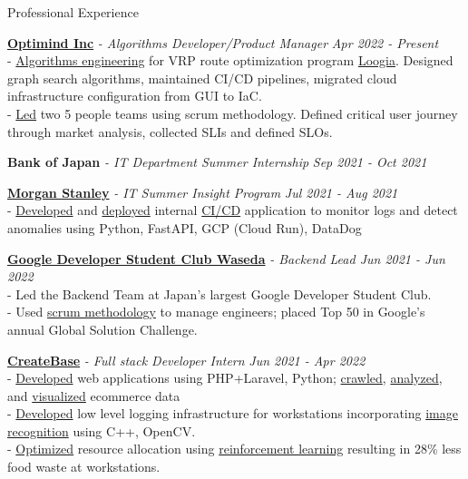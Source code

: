 \documentclass{resume} %
\begin{document}
\begin{rSection}{Professional Experience}

{\bf \href{https://www.optimind.tech/}{Optimind Inc}} {\textit{- Algorithms Developer/Product Manager }} \hfill {\em Apr 2022 - Present} 
\\- \uline{Algorithms engineering} for VRP route optimization program \href{https://loogia.jp/?_ga=2.72237267.1726635224.1669133714-1962149220.1665458028}{Loogia}. Designed graph search algorithms, maintained CI/CD pipelines, migrated cloud infrastructure configuration from GUI to IaC. 
\\- \uline{Led} two 5 people teams using scrum methodology. Defined critical user journey through market analysis, collected SLIs and defined SLOs.  


{\bf Bank of Japan}{\textit{ - IT Department Summer Internship}} \hfill {\em Sep 2021 - Oct 2021} 

{\bf \href{https://www.morganstanley.co.jp/ja}{Morgan Stanley}}\textit{ - IT Summer Insight Program} \hfill {\em Jul 2021 - Aug 2021} 
\\- \uline{Developed} and \uline{deployed} internal \uline{CI/CD} application to monitor logs and detect anomalies using Python, FastAPI, GCP (Cloud Run), DataDog

{ \bf\href{https://gdsc.community.dev/waseda-university/}{Google Developer Student Club Waseda}} \textit{ - Backend Lead \hfill {Jun 2021 - Jun 2022}}
\\- Led the Backend Team at Japan's largest Google Developer Student Club. 
\\- Used \uline{scrum methodology} to manage engineers; placed Top 50 in Google's annual Global Solution Challenge. 

{\bf \href{https://createbase.work/}{CreateBase}} {\textit{- Full stack Developer Intern }} \hfill {\em Jun 2021 - Apr 2022} 
\\- \uline{Developed} web applications using PHP+Laravel, Python; \uline{crawled}, \uline{analyzed}, and \uline{visualized} ecommerce data
\\- \uline{Developed} low level logging infrastructure for workstations incorporating \uline{image recognition} using C++, OpenCV.
\\- \uline{Optimized} resource allocation using \uline{reinforcement learning} resulting in 28\% less food waste at workstations. 



\end{rSection}
\end{document}
